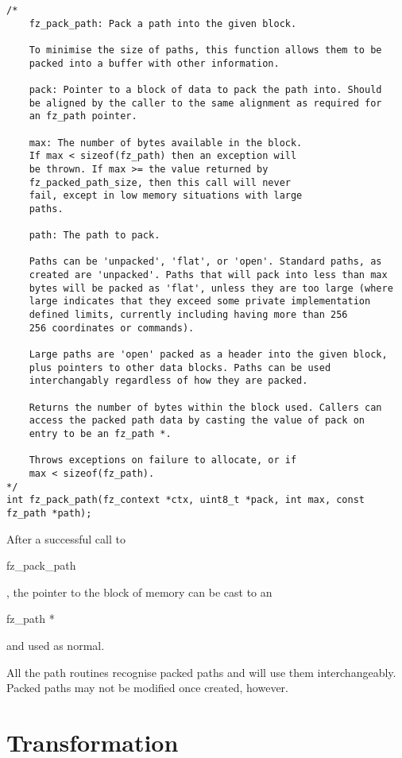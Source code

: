 \documentclass[oneside]{book}
\begin{document}
\begin{lstlisting}
/*
	fz_pack_path: Pack a path into the given block.

	To minimise the size of paths, this function allows them to be
	packed into a buffer with other information.

	pack: Pointer to a block of data to pack the path into. Should
	be aligned by the caller to the same alignment as required for
	an fz_path pointer.

	max: The number of bytes available in the block.
	If max < sizeof(fz_path) then an exception will
	be thrown. If max >= the value returned by
	fz_packed_path_size, then this call will never
	fail, except in low memory situations with large
	paths.

	path: The path to pack.

	Paths can be 'unpacked', 'flat', or 'open'. Standard paths, as
	created are 'unpacked'. Paths that will pack into less than max
	bytes will be packed as 'flat', unless they are too large (where
	large indicates that they exceed some private implementation
	defined limits, currently including having more than 256
	256 coordinates or commands).
	
	Large paths are 'open' packed as a header into the given block,
	plus pointers to other data blocks. Paths can be used
	interchangably regardless of how they are packed.

	Returns the number of bytes within the block used. Callers can
	access the packed path data by casting the value of pack on
	entry to be an fz_path *.

	Throws exceptions on failure to allocate, or if
	max < sizeof(fz_path).
*/
int fz_pack_path(fz_context *ctx, uint8_t *pack, int max, const fz_path *path);
\end{lstlisting}

After a successful call to \begin{tt}fz\_pack\_path\end{tt}, the pointer to the block of memory can be cast to an \begin{tt}fz\_path *\end{tt} and used as normal.

All the path routines recognise packed paths and will use them interchangeably. Packed paths may not be modified once created, however.

\section{Transformation}
\end{document}
